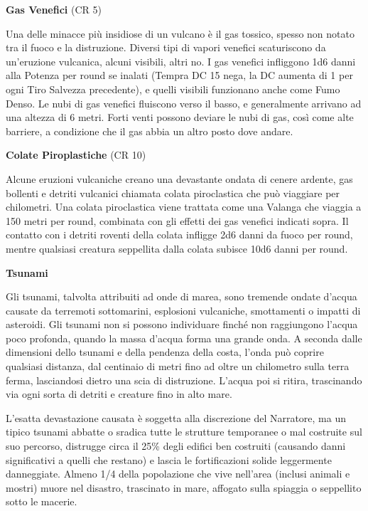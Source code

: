 \documentclass[a4paper,11pt,twoside,openany]{book}
\begin{document}
\textbf{Gas Venefici} (CR 5)

Una delle minacce più insidiose di un vulcano è il gas tossico, spesso non notato tra il fuoco e la distruzione. Diversi tipi di vapori venefici scaturiscono da un'eruzione vulcanica, alcuni visibili, altri no. I gas venefici infliggono 1d6 danni alla Potenza per round se inalati (Tempra DC 15 nega, la DC aumenta di 1 per ogni Tiro Salvezza precedente), e quelli visibili funzionano anche come Fumo Denso. Le nubi di gas venefici fluiscono verso il basso, e generalmente arrivano ad una altezza di 6 metri. Forti venti possono deviare le nubi di gas, così come alte barriere, a condizione che il gas abbia un altro posto dove andare.

\textbf{Colate Piroplastiche} (CR 10)

Alcune eruzioni vulcaniche creano una devastante ondata di cenere ardente, gas bollenti e detriti vulcanici chiamata colata piroclastica che può viaggiare per chilometri. Una colata piroclastica viene trattata come una Valanga che viaggia a 150 metri per round, combinata con gli effetti dei gas venefici indicati sopra. Il contatto con i detriti roventi della colata infligge 2d6 danni da fuoco per round, mentre qualsiasi creatura seppellita dalla colata subisce 10d6 danni per round.

\textbf{Tsunami}

Gli tsunami, talvolta attribuiti ad onde di marea, sono tremende ondate d'acqua causate da terremoti sottomarini, esplosioni vulcaniche, smottamenti o impatti di asteroidi. Gli tsunami non si possono individuare finché non raggiungono l'acqua poco profonda, quando la massa d'acqua forma una grande onda. A seconda dalle dimensioni dello tsunami e del­la pendenza della costa, l'onda può coprire qualsiasi distanza, dal centinaio di metri fino ad oltre un chilometro sulla terra ferma, lasciandosi dietro una scia di distruzione. L'acqua poi si ritira, trascinando via ogni sorta di detriti e creature fino in alto mare.

L'esatta devastazione causata è soggetta alla discrezione del Narratore, ma un tipico tsunami abbatte o sradica tutte le strutture temporanee o mal costruite sul suo percorso, distrugge circa il 25\% degli edifici ben costruiti (causando danni significativi a quelli che restano) e lascia le fortificazioni solide leggermente danneggiate. Almeno 1/4 della popolazione che vive nell'area (inclusi animali e mostri) muore nel disastro, trascinato in mare, affogato sulla spiaggia o seppellito sotto le macerie.
\end{document}
